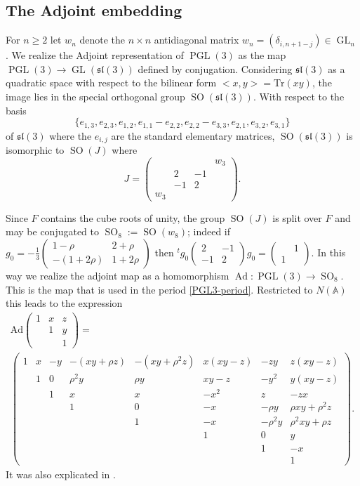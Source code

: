 \documentclass[12pt]{amsart}
\newcommand{\GL}{\operatorname{GL}}
\newcommand{\PGL}{\operatorname{PGL}}
\newcommand{\SO}{\operatorname{SO}}
\newcommand{\Ad}{\operatorname{Ad}}
\newcommand{\A}{\mathbb{A}}
\newcommand{\liesl}{{\mathfrak{sl}}}
\theoremstyle{remark}
\begin{document}
\subsection{The Adjoint embedding}\label{The Ad embedding}
For $n\geq2$ let $w_n$ denote the $n\times n$ antidiagonal matrix $w_n=(\delta_{i,n+1-j})\in \GL_n$.
We realize the Adjoint representation of $\PGL(3)$ as the map $\PGL(3)\to \GL(\liesl(3))$ defined by conjugation.  Considering $\liesl(3)$ as a quadratic
space with respect to the bilinear form $<x,y>=\text{Tr}(xy)$, the image lies in the special orthogonal group $\SO(\liesl(3))$.
With respect to the basis
$$\{e_{1,3},e_{2,3},e_{1,2},e_{1,1}-e_{2,2},e_{2,2}-e_{3,3},e_{2,1},e_{3,2},e_{3,1}\}$$
of $\liesl(3)$ where the $e_{i,j}$ are the standard elementary matrices, $\SO(\liesl(3))$ is isomorphic to $\SO(J)$ where
$$J=\begin{pmatrix}&&&w_3\\&2&-1&\\&-1&2&\\w_3&&&\end{pmatrix}.
$$

Since $F$ contains the cube roots of unity, the group $\SO(J)$ is split over $F$ and may be conjugated to $\SO_8:=\SO(w_8)$; indeed 
if $g_0=-\tfrac13 \left(\begin{smallmatrix}1-\rho&2+\rho\\-(1+2\rho)&1+2\rho\end{smallmatrix}\right)$ then
$^t g_0\left( \begin{smallmatrix}2&-1\\-1&2\end{smallmatrix} \right)g_0=\left(\begin{smallmatrix}&1\\1&\end{smallmatrix}\right)$.
In this way we realize the adjoint map as a homomorphism $\Ad: \PGL(3)\rightarrow \SO_8$. This is the map that is used in the period \eqref{PGL3-period}.
Restricted to $N(\A)$ this leads to
the expression
\begin{multline*}\text{Ad}\begin{pmatrix}1&x&z\\&1&y\\&&1\end{pmatrix}=\\
\begin{pmatrix}1&x&-y&-(xy+\rho z)&-(xy+\rho^2z)&x(xy-z)&-zy&z(xy-z)\\&1&0&\rho^2 y&\rho y&xy-z&-y^2&y(xy-z)\\
&&1&x&x&-x^2&z&-zx\\&&&1&0&-x&-\rho y&\rho xy+\rho^2 z\\&&&&1&-x&-\rho^2y&\rho^2xy+\rho z\\&&&&&1&0&y\\&&&&&&1&-x\\&&&&&&&1
\end{pmatrix}.
\end{multline*}
It was also explicated in \cite{MR1882041}.
\end{document}
